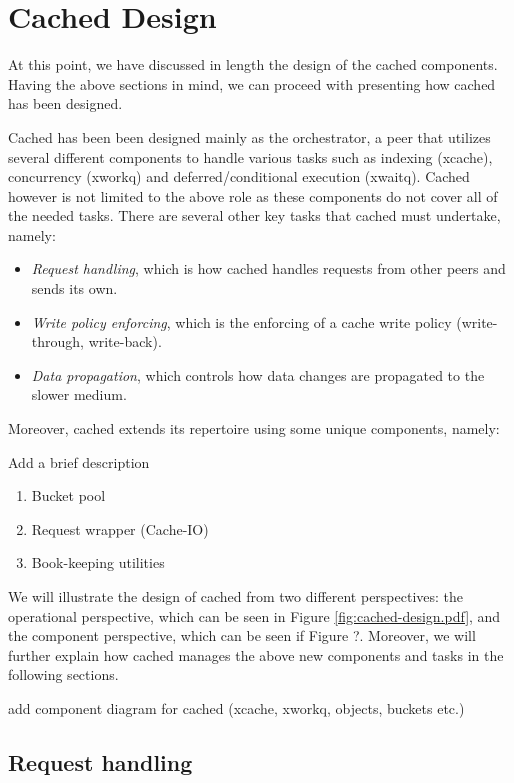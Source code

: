 \section{Cached Design}\label{sec:cached-design}

At this point, we have discussed in length the design of the cached components.  
Having the above sections in mind, we can proceed with presenting how cached 
has been designed.

Cached has been been designed mainly as the orchestrator, a peer that utilizes 
several different components to handle various tasks such as indexing (xcache), 
concurrency (xworkq) and deferred/conditional execution (xwaitq). Cached 
however is not limited to the above role as these components do not cover all 
of the needed tasks. There are several other key tasks that cached must 
undertake, namely:

\begin{itemize}
	\item \textit{Request handling}, which is how cached handles requests 
		from other peers and sends its own.
	\item \textit{Write policy enforcing}, which is the enforcing of a 
		cache write policy (write-through, write-back).
	\item \textit{Data propagation}, which controls how data changes are 
		propagated to the slower medium.
\end{itemize}

Moreover, cached extends its repertoire using some unique components, namely:

\fixme Add a brief description
\begin{enumerate}
	\item Bucket pool
	\item Request wrapper (Cache-IO)
	\item Book-keeping utilities
\end{enumerate}

We will illustrate the design of cached from two different perspectives: the 
operational perspective, which can be seen in Figure 
\ref{fig:cached-design.pdf}, and the component perspective, which can be seen 
if Figure ?. Moreover, we will further explain how cached manages the above new 
components and tasks in the following sections.

\fixme add component diagram for cached (xcache, xworkq, objects, buckets etc.)

\subsection{Request handling}

